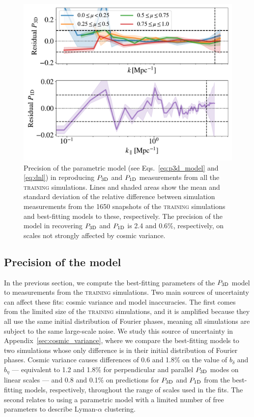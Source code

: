 \documentclass[fleqn,usenatbib]{mnras}
\newcommand{\lya}{Lyman-$\alpha$\xspace}
\newcommand{\poned}{\ensuremath{P_{\rm 1D}}\xspace}
\newcommand{\pthreed}{\ensuremath{P_{\rm 3D}}\xspace}
\newcommand{\lacehc}{\textsc{training}\xspace}
\begin{document}
\begin{figure}
\includegraphics[width=\columnwidth]{figures/goodness_fit_all.pdf}
\centering
\caption{Precision of the parametric model (see Eqs.~\ref{eq:p3d_model} and \ref{eq:dnl}) in reproducing \pthreed and \poned measurements from all the \lacehc simulations. Lines and shaded areas show the mean and standard deviation of the relative difference between simulation measurements from the 1650 snapshots of the \lacehc simulations and best-fitting models to these, respectively. The precision of the model in recovering \pthreed and \poned is 2.4 and 0.6\%, respectively, on scales not strongly affected by cosmic variance.}
\label{fig:goodness}
\end{figure}

\subsection{Precision of the model}
\label{sec:input_precision}

In the previous section, we compute the best-fitting parameters of the \pthreed model to measurements from the \lacehc simulations. Two main sources of uncertainty can affect these fits: cosmic variance and model inaccuracies. The first comes from the limited size of the \lacehc simulations, and it is amplified because they all use the same initial distribution of Fourier phases, meaning all simulations are subject to the same large-scale noise. We study this source of uncertainty in Appendix~\ref{sec:cosmic_variance}, where we compare the best-fitting models to two simulations whose only difference is in their initial distribution of Fourier phases. Cosmic variance causes differences of 0.6 and 1.8\% on the value of $b_\delta$ and $b_\eta$ --- equivalent to 1.2 and 1.8\% for perpendicular and parallel \pthreed modes on linear scales --- and 0.8 and 0.1\% on predictions for \pthreed and \poned from the best-fitting models, respectively, throughout the range of scales used in the fits. The second relates to using a parametric model with a limited number of free parameters to describe \lya clustering. 
\end{document}
